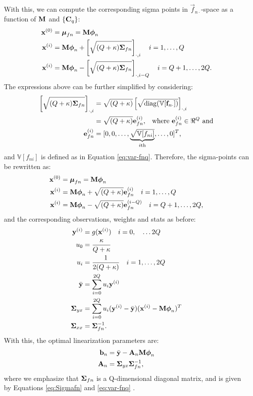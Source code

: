 \documentclass[11pt,a4paper]{article}
\newcommand{\x}{\vec{x}}
\newcommand{\y}{\vec{y}}
\renewcommand{\xi}{\x^{(i)}}
\newcommand{\yi}{\y^{(i)}}
\newcommand{\ybar}{\bar{\y}}
\newcommand{\Sigmaxx}{\mat{\Sigma}_{xx}}
\newcommand{\Sigmayx}{\mat{\Sigma}_{yx}}
\newcommand{\w}{u}
\newcommand{\wi}{u_i}
\newcommand{\wo}{\w_0}
\newcommand{\xo}{\x^{(0)}}
\renewcommand{\Q}{Q}
\renewcommand{\k}{\kappa}
\newcommand{\mathcol}[2]{  \left[#1\right]_{\cdot, #2} }
\newcommand{\f}{\vec{f}}
\newcommand{\fn}{\f_{n \cdot}}
\newcommand{\An}{\mat{A}_n}
\newcommand{\bn}{\vec{b}_n}
\newcommand{\phin}{\vecS{\phi}_n}
\newcommand{\mufn}{\vecS{\mu}_{fn}}
\newcommand{\Sigmafn}{\mat{\Sigma}_{fn}}
\newcommand{\M}{\mat{M}}
\newcommand{\fni}{f_{ni}}
\newcommand{\var}[1]{\mathbb{V}[#1]}
\newcommand{\sigmafn}[1]{\vec{e}_{fn}^{(#1)}}
\begin{document}
With this, we can compute the corresponding sigma points in $\fn$-space  as a function of 
$\M$ and $\{ \mathbf{C}_q \}$:
\begin{align}
	\xo & = \mufn = \M \phin \\
	\xi & = \M \phin  + \mathcol{\sqrt{ (\Q + \k) \Sigmafn}}{i} \quad i=1, \ldots, \Q \\
	\xi & = \M \phin  - \mathcol{\sqrt{ (\Q + \k) \Sigmafn}}{i-Q} \quad i=Q+1, \ldots, 2\Q 	\text{.}
\end{align}
The expressions above can be further simplified by considering:
\begin{align}
	\mathcol{\sqrt{ (\Q + \k) \Sigmafn}}{i} &= \sqrt{ (\Q + \k)} \mathcol{\sqrt{\diag (\var{\fn})} }{i} \\
	&=  \sqrt{ (\Q + \k)}  \sigmafn{i} \text{,} \quad \text{where }  \sigmafn{i} \in \Re^\Q \text{ and} \\
	\sigmafn{i} &= [0, 0, \ldots, \underbrace{\sqrt{\var{\fni}}}_{i\mth}, \ldots, 0 ]^T \text{,}
\end{align}
and $\var{\fni}$ is defined as in Equation \eqref{eq:var-fnq}. Therefore, the sigma-points can 
be rewritten as:
\begin{align}
\xo & = \mufn = \M \phin \\
	\xi & = \M \phin +  \sqrt{ (\Q + \k)}  \sigmafn{i} \quad i=1, \ldots, \Q \\
	\xi & = \M \phin - \sqrt{ (\Q + \k)}  \sigmafn{i-Q} \quad i=Q+1, \ldots, 2\Q \text{,}
\end{align}
 and the corresponding observations, weights and stats as before:
 \begin{align}
	\yi & = g(\xi) \quad i = 0, \quad \ldots 2\Q\\
	\wo &= \frac{\k}{\Q + \k} \\
	\wi &= \frac{1}{2(\Q + \k)}  \quad  i = 1, \ldots, 2\Q  \\
	\ybar  &=  \sum_{i=0}^{2 \Q} \wi \yi 	\\
	\Sigmayx  &= \sum_{i=0}^{2\Q} \wi (\yi - \ybar) (\xi - \M \phin)^T \\
	\Sigmaxx &= \Sigmafn^{-1} \text{.}
\end{align}
With this, the optimal linearization parameters are:
\begin{align}
	\bn & = \ybar - \An \M \phin \\
	\An &= \Sigmayx \Sigmafn^{-1} \text{,}
\end{align}
where we emphasize that  $\Sigmafn$ is a  Q-dimensional diagonal matrix, and is given 
by Equations \eqref{eq:Sigmafn} and \eqref{eq:var-fnq} .
\end{document}
